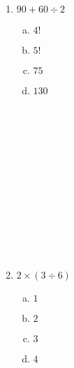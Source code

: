 \documentclass[a4paper,14pt]{article}
\begin{document}
\begin{multicols}{2}
\begin{enumerate}[1)]
\begin{enumerate}[a)]
	        \end{enumerate}
            \item $90 + 60 \div 2$
            \begin{enumerate}[a)]
            	\item $4!$
            	\item $5!$
            	\item $75$
            	\item $130$ \\\\\\\\\\\\\\\\\\\\\\\\\\
            \end{enumerate}
            \item $2 \times (3 \div 6)$
            \begin{enumerate}[a)]
            	\item $1$
            	\item $2$
            	\item $3$
            	\item $4$ \\\\\\\\\\\\\\\\\\\\\\\\\\
            \end{enumerate}
        \end{enumerate}
    \end{multicols}
\end{document}
